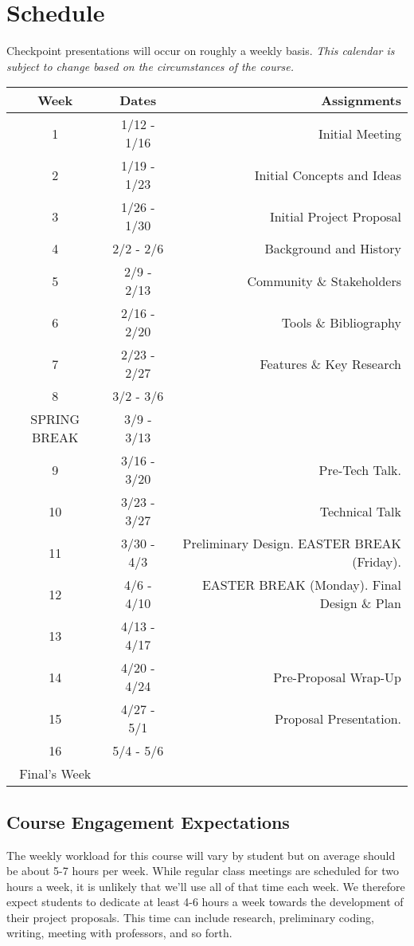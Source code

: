 \documentclass[10pt]{article}
\begin{document}
\section{Schedule}

Checkpoint presentations will occur on roughly a weekly basis. \textit{This calendar is subject to change based on the circumstances of the course.}
\begin{center}
\begin{tabular}{|c|c|r|}
\hline 
Week & Dates & Assignments \\
\hline
1 & 1/12 - 1/16 & Initial Meeting \\
\hline
2 & 1/19 - 1/23 & Initial Concepts and Ideas\\
\hline
3 & 1/26 - 1/30 & Initial Project Proposal   \\
\hline
4 & 2/2 - 2/6 &  Background and History \\
\hline
5 & 2/9 - 2/13 &  Community \& Stakeholders \\
\hline
6 & 2/16 - 2/20 & Tools \& Bibliography  \\
\hline
7 & 2/23 - 2/27 &  Features \& Key Research \\
\hline
8 & 3/2 - 3/6 &   \\
\hline 
SPRING BREAK & 3/9 - 3/13 &  \\
\hline
9 & 3/16 - 3/20 & Pre-Tech Talk. \\
\hline
10 & 3/23 - 3/27 & Technical Talk \\
\hline
11 & 3/30 - 4/3 & Preliminary Design. EASTER BREAK (Friday).\\
\hline
12 & 4/6 - 4/10 & EASTER BREAK (Monday). Final Design \& Plan \\
\hline
13 & 4/13 - 4/17 &   \\
\hline
14 & 4/20 - 4/24 &  Pre-Proposal Wrap-Up \\
\hline
15 & 4/27 - 5/1 & Proposal Presentation. \\ 
\hline
16 & 5/4 - 5/6 & \\
\hline
Final's Week &  &  \\ 
\hline
\end{tabular}
\end{center}


\subsection{Course Engagement Expectations}

The weekly workload for this course will vary by student but on average should be about 5-7 hours per week.  While regular class meetings are scheduled for two hours a week, it is unlikely that we'll use all of that time each week.  We therefore expect students to dedicate at least 4-6 hours a week towards the development of their project proposals.  This time can include research, preliminary coding, writing, meeting with professors, and so forth.
\end{document}
